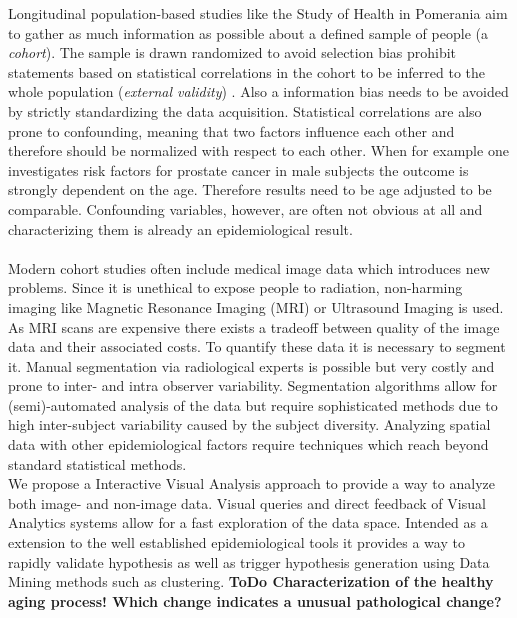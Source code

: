 \documentclass[journal]{style/vgtc}           %
\begin{document}
Longitudinal population-based studies like the Study of Health in Pomerania \cite{Volzke2011} aim to gather as much information as possible about a defined sample of people (a \emph{cohort}).
%
The sample is drawn randomized to avoid selection bias prohibit statements based on statistical correlations in the cohort to be inferred to the whole population (\emph{external validity}) \cite{Fletcher2012}.
%
Also a information bias needs to be avoided by strictly standardizing the data acquisition.
%
Statistical correlations are also prone to confounding, meaning that two factors influence each other and therefore should be normalized with respect to each other.
%
When for example one investigates risk factors for prostate cancer in male subjects the outcome is strongly dependent on the age.
%
Therefore results need to be age adjusted to be comparable.
%
Confounding variables, however, are often not obvious at all and characterizing them is already an epidemiological result.
\\\\
Modern cohort studies often include medical image data which introduces new problems.
%
Since it is unethical to expose people to radiation, non-harming imaging like Magnetic Resonance Imaging (MRI) or Ultrasound Imaging is used.
%
As MRI scans are expensive there exists a tradeoff between quality of the image data and their associated costs.
%
To quantify these data it is necessary to segment it.
%
Manual segmentation via radiological experts is possible but very costly and prone to inter- and intra observer variability.
%
Segmentation algorithms allow for (semi)-automated analysis of the data but require sophisticated methods due to high inter-subject variability caused by the subject diversity.
%
Analyzing spatial data with other epidemiological factors require techniques which reach beyond standard statistical methods.
\\
We propose a Interactive Visual Analysis approach \cite{Thomas2005} to provide a way to analyze both image- and non-image data.
%
Visual queries and direct feedback of Visual Analytics systems allow for a fast exploration of the data space.
%
Intended as a extension to the well established epidemiological tools it provides a way to rapidly validate hypothesis as well as trigger hypothesis generation using Data Mining methods such as clustering.
%
\textbf{ToDo Characterization of the healthy aging process! Which change indicates a unusual pathological change?}

\end{document}
